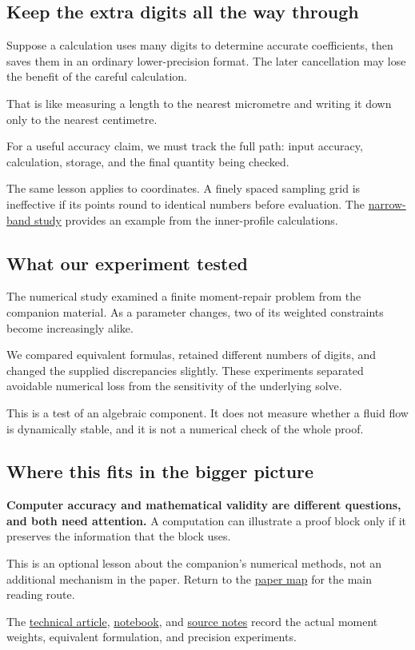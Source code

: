 \documentclass[
  english,
  11pt,
]{article}
\begin{document}
\subsection{Keep the extra digits all the way
through}\label{keep-the-extra-digits-all-the-way-through}

Suppose a calculation uses many digits to determine accurate
coefficients, then saves them in an ordinary lower-precision format. The
later cancellation may lose the benefit of the careful calculation.

That is like measuring a length to the nearest micrometre and writing it
down only to the nearest centimetre.

For a useful accuracy claim, we must track the full path: input
accuracy, calculation, storage, and the final quantity being checked.

The same lesson applies to coordinates. A finely spaced sampling grid is
ineffective if its points round to identical numbers before evaluation.
The \href{../d6_global_axis/article.html}{narrow-band study} provides an
example from the inner-profile calculations.

\subsection{What our experiment
tested}\label{what-our-experiment-tested}

The numerical study examined a finite moment-repair problem from the
companion material. As a parameter changes, two of its weighted
constraints become increasingly alike.

We compared equivalent formulas, retained different numbers of digits,
and changed the supplied discrepancies slightly. These experiments
separated avoidable numerical loss from the sensitivity of the
underlying solve.

This is a test of an algebraic component. It does not measure whether a
fluid flow is dynamically stable, and it is not a numerical check of the
whole proof.

\subsection{Where this fits in the bigger
picture}\label{where-this-fits-in-the-bigger-picture}

\textbf{Computer accuracy and mathematical validity are different
questions, and both need attention.} A computation can illustrate a
proof block only if it preserves the information that the block uses.

This is an optional lesson about the companion's numerical methods, not
an additional mechanism in the paper. Return to the
\href{../paper-map/article.html}{paper map} for the main reading route.

The \href{technical-article.html}{technical article},
\href{../../code/d7_conditioning/study.ipynb}{notebook}, and
\href{source-notes.md}{source notes} record the actual moment weights,
equivalent formulation, and precision experiments.
\end{document}
